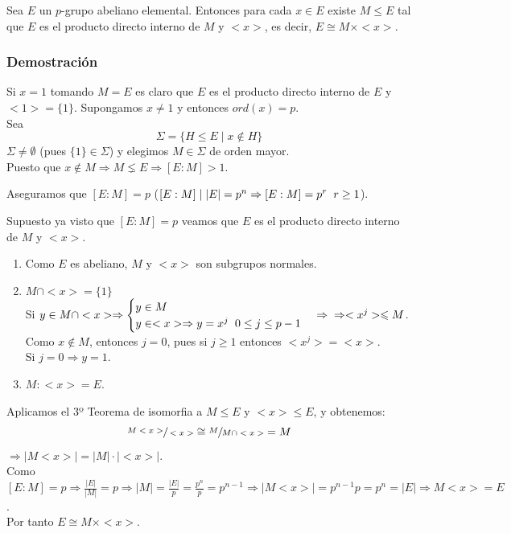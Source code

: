 \documentclass[11pt,a4paper]{article}
\begin{document}
Sea $E$ un $p$-grupo abeliano elemental. Entonces para cada $x \in E$ existe $M \leq E$ tal que $E$ es el producto directo interno de $M$ y $<x>$, es decir, $E \cong M \times <x>$.

\subsubsection*{Demostración}

Si $x = 1$ tomando $M = E$ es claro que $E$ es el producto directo interno de $E$ y $<1> = \{1\}$. Supongamos $x \neq 1$ y entonces $ord(x) = p$. \\
Sea
$$\Sigma = \{H \leqslant E \mid x \notin H\}$$
$\Sigma \neq \emptyset$ (pues $\{1\} \in \Sigma$) y elegimos $M \in \Sigma$ de orden mayor. \\Puesto que $x \notin M \Rightarrow M \lneq E \Rightarrow [E:M] > 1$.

Aseguramos que $[E:M] = p$ ($[E:M] \mid |E| = p^{n} \Rightarrow [E:M] = p^{r} \hspace{0.2cm} r \geq 1$).

Supuesto ya visto que $[E:M] = p$ veamos que $E$ es el producto directo interno de $M$ y $<x>$.
\begin{enumerate}[label = \arabic*)]
\item Como $E$ es abeliano, $M$ y $<x>$ son subgrupos normales.
\item $M \cap <x> = \{1\}$ \\
Si $y \in M \cap <x> \Rightarrow
\begin{cases}
y \in M \\
y \in <x> \Rightarrow y = x^{j} \hspace{0.2cm} 0 \leq j \leq p-1
\end{cases} \Rightarrow \\
\Rightarrow <x^{j}> \leqslant M$. \\
Como $x \notin M$, entonces $j = 0$, pues si $j \geq 1$ entonces $<x^{j}> = <x>$. \\
Si $j = 0 \Rightarrow y = 1$.
\item $M: <x> = E$.
\end{enumerate}
Aplicamos el 3º Teorema de isomorfia a $M \leqslant E$ y $<x> \leqslant E$, y obtenemos:
$$\sfrac{M<x>}{<x>} \cong \sfrac{M}{M \cap <x>} = M$$
$\Rightarrow |M <x>| = |M| \cdot |<x>|$. \\
Como $[E:M] = p \Rightarrow \frac{|E|}{|M|} = p \Rightarrow |M| = \frac{|E|}{p} = \frac{p^{n}}{p} = p^{n-1} \Rightarrow |M <x>| = p^{n-1} p = p^{n} = |E| \Rightarrow  M <x> = E$. \\
Por tanto $E \cong M \times <x>$.
\end{document}
